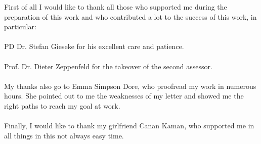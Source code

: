 
First of all I would like to thank all those who supported me during the preparation of this work and who contributed a lot to the success of this work, in particular:\\
\\
PD Dr. Stefan Gieseke for his excellent care and patience.\\
\\
Prof. Dr. Dieter Zeppenfeld for the takeover of the second assessor.\\
\\
My thanks also go to Emma Simpson Dore, who proofread my work in numerous hours. She pointed out to me the weaknesses of my letter and showed me the right paths to reach my goal at work.\\
\\ 
Finally, I would like to thank my girlfriend Canan Kaman, who supported me in all things in this not always easy time.\\


 
         

